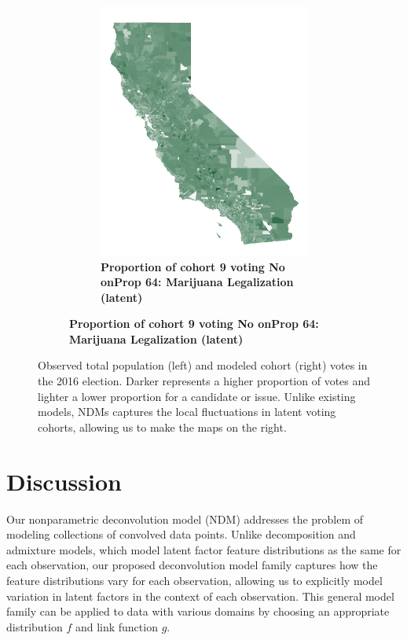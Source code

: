 \documentclass[twoside,11pt]{article}
\begin{document}
\begin{figure}[p]
\begin{subfigure}{\textwidth}
\begin{subfigure}{.45\textwidth}
            \includegraphics[width=\textwidth]{map_X9.png}
            \caption*{\centering \footnotesize \textbf{Proportion of cohort 9 voting No on\newline Prop 64: Marijuana Legalization (latent)}}
        \end{subfigure}
    \end{subfigure}
    \vspace{10px}
    
    \caption{Observed total population (left) and modeled cohort (right) votes in the 2016 election.  Darker represents a higher proportion of votes and lighter a lower proportion for a candidate or issue.  Unlike existing models, NDMs captures the local fluctuations in latent voting cohorts, allowing us to make the maps on the right.}
    \label{fig:trump_maps}
\end{figure}



\section{Discussion}
\label{sec:conclusion}
Our nonparametric deconvolution model (NDM) addresses the problem of modeling collections of convolved data points.  Unlike decomposition and admixture models, which model latent factor feature distributions as the same for each observation, our proposed deconvolution model family captures how the feature distributions vary for each observation, allowing us to explicitly model variation in latent factors in the context of each observation.  This general model family can be applied to data with various domains by choosing an appropriate distribution $f$ and link function $g$.  
\end{document}
